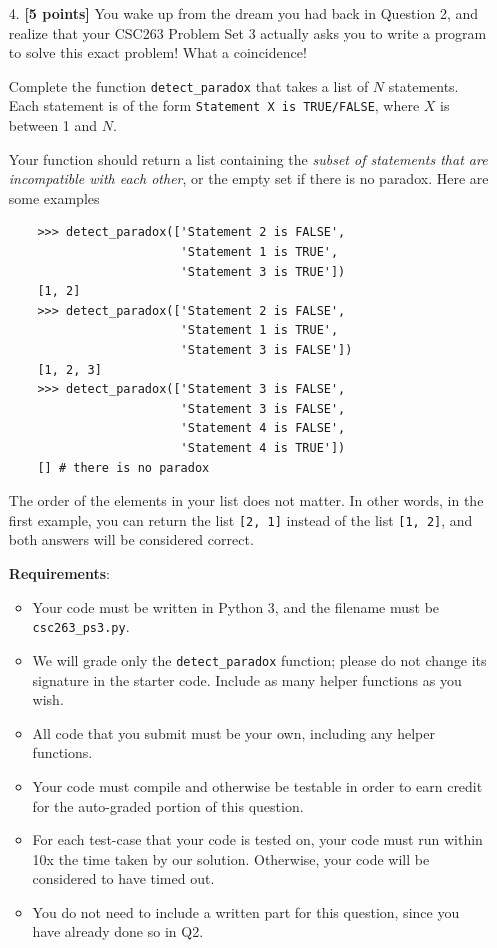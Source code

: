 \documentclass{assignment-263}
\begin{document}
\begin{enumerate}
\item[4.] \textbf{[5 points]} You wake up from the dream you had
    back in Question 2, and realize that your CSC263 Problem Set 3
    actually asks you to write a program to solve this exact problem!
    What a coincidence!

    Complete the function \verb|detect_paradox| that takes a list of $N$ statements.
    Each statement is of the form \verb|Statement X is TRUE/FALSE|,
    where $X$ is between 1 and $N$.

    Your function should return a list containing the \textit{subset of statements that are incompatible with each other},
    or the empty set if there is no paradox. Here are some examples

    \begin{verbatim}
    >>> detect_paradox(['Statement 2 is FALSE',
                        'Statement 1 is TRUE',
                        'Statement 3 is TRUE'])
    [1, 2]
    >>> detect_paradox(['Statement 2 is FALSE',
                        'Statement 1 is TRUE',
                        'Statement 3 is FALSE'])
    [1, 2, 3]
    >>> detect_paradox(['Statement 3 is FALSE',
                        'Statement 3 is FALSE',
                        'Statement 4 is FALSE',
                        'Statement 4 is TRUE'])
    [] # there is no paradox
    \end{verbatim}

    The order of the elements in your list does not matter. In other words, in the first example,
    you can return the list \verb|[2, 1]| instead of the list \verb|[1, 2]|, and both answers
    will be considered correct.

\textbf{Requirements}:
\begin{itemize}
\item Your code must be written in Python 3, and the filename must be \verb|csc263_ps3.py|.
\item We will grade only the \verb|detect_paradox| function;
      please do not change its signature in the starter code.
      Include as many helper functions as you wish.
\item All code that you submit must be your own, including any helper functions.
\item Your code must compile and otherwise be testable in order to earn credit
      for the auto-graded portion of this question.
\item For each test-case that your code is tested on, your code must run within
10x the time taken by our solution. Otherwise, your code will be considered to have timed out.
\item You do not need to include a written part for this question, since you have already done so in Q2.
\end{itemize}

\end{enumerate}
\end{document}
